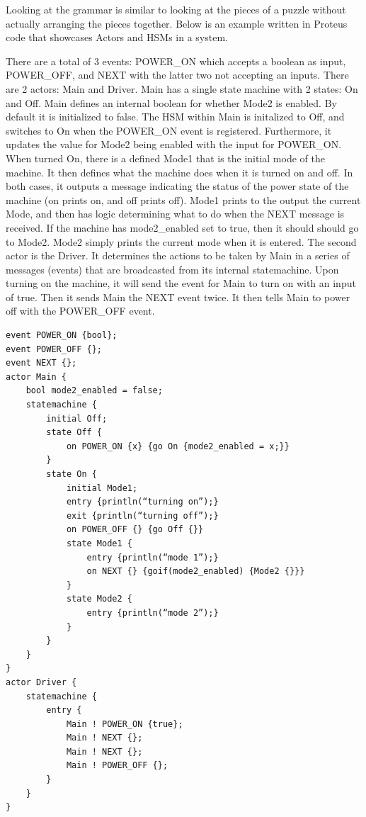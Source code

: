 Looking at the grammar is similar to looking at the pieces of a puzzle without actually arranging the pieces together.
Below is an example written in Proteus code that showcases Actors and HSMs in a system.

There are a total of 3 events: POWER\_ON which accepts a boolean as input, POWER\_OFF, and NEXT with the latter two not accepting an inputs.
There are 2 actors: Main and Driver.
Main has a single state machine with 2 states: On and Off.
Main defines an internal boolean for whether Mode2 is enabled.
By default it is initialized to false.
The HSM within Main is initalized to Off, and switches to On when the POWER\_ON event is registered.
Furthermore, it updates the value for Mode2 being enabled with the input for POWER\_ON.
When turned On, there is a defined Mode1 that is the initial mode of the machine.
It then defines what the machine does when it is turned on and off.
In both cases, it outputs a message indicating the status of the power state of the machine (on prints on, and off prints off).
Mode1 prints to the output the current Mode, and then has logic determining what to do when the NEXT message is received.
If the machine has mode2\_enabled set to true, then it should should go to Mode2.
Mode2 simply prints the current mode when it is entered.
The second actor is the Driver.
It determines the actions to be taken by Main in a series of messages (events) that are broadcasted from its internal statemachine.
Upon turning on the machine, it will send the event for Main to turn on with an input of true.
Then it sends Main the NEXT event twice.
It then tells Main to power off with the POWER\_OFF event.

\begin{verbatim}
event POWER_ON {bool};
event POWER_OFF {};
event NEXT {};
actor Main {
    bool mode2_enabled = false;
    statemachine {
        initial Off;
        state Off {
            on POWER_ON {x} {go On {mode2_enabled = x;}}
        }
        state On {
            initial Mode1;
            entry {println(“turning on”);}
            exit {println(“turning off”);}
            on POWER_OFF {} {go Off {}}
            state Mode1 {
                entry {println(“mode 1”);}
                on NEXT {} {goif(mode2_enabled) {Mode2 {}}}
            }
            state Mode2 {
                entry {println(“mode 2”);}
            }
        }
    }
}
actor Driver {
    statemachine {
        entry {
            Main ! POWER_ON {true};
            Main ! NEXT {};
            Main ! NEXT {};
            Main ! POWER_OFF {};
        }
    }
}
\end{verbatim}


